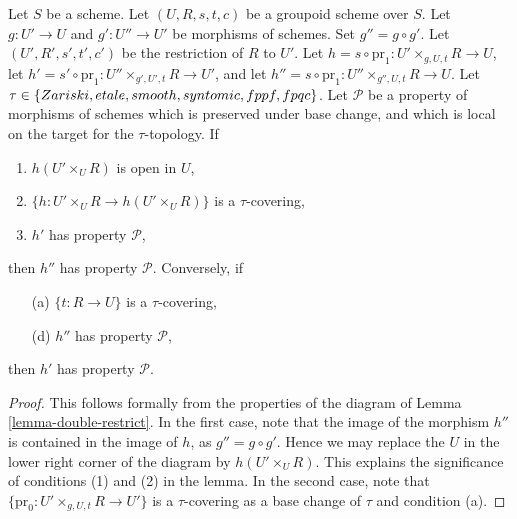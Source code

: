 \begin{lemma}
\label{lemma-double-restrict-property}
Let $S$ be a scheme.
Let $(U, R, s, t, c)$ be a groupoid scheme over $S$.
Let $g : U' \to U$ and $g' : U'' \to U'$ be morphisms of schemes.
Set $g'' = g \circ g'$.
Let $(U', R', s', t', c')$ be the restriction of $R$ to $U'$.
Let $h = s \circ \text{pr}_1 : U' \times_{g, U, t} R \to U$,
let $h' = s' \circ \text{pr}_1 : U'' \times_{g', U', t} R \to U'$, and
let $h'' = s \circ \text{pr}_1 : U'' \times_{g'', U, t} R \to U$.
Let $\tau \in \{Zariski,\linebreak[0] etale,\linebreak[0]
smooth,\linebreak[0] syntomic,\linebreak[0] fppf,\linebreak[0] fpqc\}$. Let
$\mathcal{P}$ be a property of morphisms of schemes
which is preserved under base change, and which
is local on the target for the $\tau$-topology. If
\begin{enumerate}
\item $h(U' \times_U R)$ is open in $U$,
\item $\{h : U' \times_U R \to h(U' \times_U R)\}$ is a $\tau$-covering,
\item $h'$ has property $\mathcal{P}$,
\end{enumerate}
then $h''$ has property $\mathcal{P}$. Conversely, if
\begin{enumerate}
\item[(a)] $\{t : R \to U\}$ is a $\tau$-covering,
\item[(d)] $h''$ has property $\mathcal{P}$,
\end{enumerate}
then $h'$ has property $\mathcal{P}$.
\end{lemma}

\begin{proof}
This follows formally from the properties of the diagram of
Lemma \ref{lemma-double-restrict}.
In the first case, note that the image of the morphism
$h''$ is contained in the image of $h$, as $g'' = g \circ g'$.
Hence we may replace the $U$ in the lower right corner of the
diagram by $h(U' \times_U R)$. This explains the significance of
conditions (1) and (2) in the lemma. In the second case, note that
$\{\text{pr}_0 : U' \times_{g, U, t} R \to U'\}$ is a $\tau$-covering
as a base change of $\tau$ and condition (a).
\end{proof}






